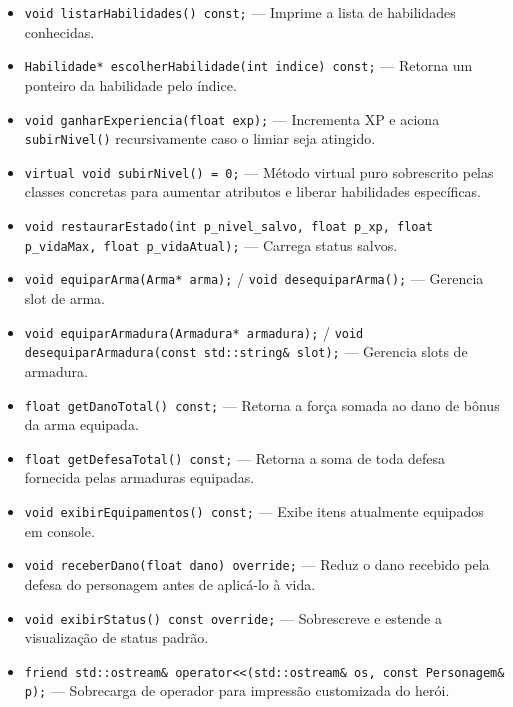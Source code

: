 \documentclass[12pt,a4paper]{article}
\begin{document}
\begin{itemize}
\begin{itemize}
        \item \texttt{void listarHabilidades() const;} --- Imprime a lista de habilidades conhecidas.
        \item \texttt{Habilidade* escolherHabilidade(int indice) const;} --- Retorna um ponteiro da habilidade pelo índice.
        \item \texttt{void ganharExperiencia(float exp);} --- Incrementa XP e aciona \texttt{subirNivel()} recursivamente caso o limiar seja atingido.
        \item \texttt{virtual void subirNivel() = 0;} --- Método virtual puro sobrescrito pelas classes concretas para aumentar atributos e liberar habilidades específicas.
        \item \texttt{void restaurarEstado(int p\_nivel\_salvo, float p\_xp, float p\_vidaMax, float p\_vidaAtual);} --- Carrega status salvos.
        \item \texttt{void equiparArma(Arma* arma);} / \texttt{void desequiparArma();} --- Gerencia slot de arma.
        \item \texttt{void equiparArmadura(Armadura* armadura);} / \texttt{void desequiparArmadura(const std::string\& slot);} --- Gerencia slots de armadura.
        \item \texttt{float getDanoTotal() const;} --- Retorna a força somada ao dano de bônus da arma equipada.
        \item \texttt{float getDefesaTotal() const;} --- Retorna a soma de toda defesa fornecida pelas armaduras equipadas.
        \item \texttt{void exibirEquipamentos() const;} --- Exibe itens atualmente equipados em console.
        \item \texttt{void receberDano(float dano) override;} --- Reduz o dano recebido pela defesa do personagem antes de aplicá-lo à vida.
        \item \texttt{void exibirStatus() const override;} --- Sobrescreve e estende a visualização de status padrão.
        \item \texttt{friend std::ostream\& operator<<(std::ostream\& os, const Personagem\& p);} --- Sobrecarga de operador para impressão customizada do herói.
    \end{itemize}
\end{itemize}
\end{document}
